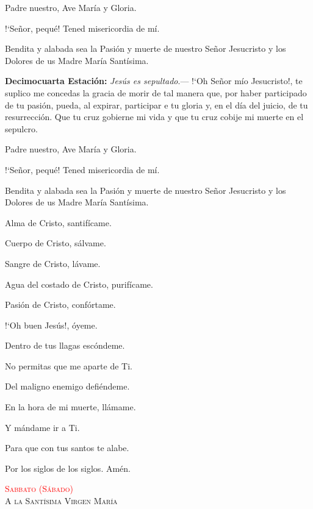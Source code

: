 \documentclass[10pt]{article}
\begin{document}
\begin{multicols}{2}
      \vspace{2mm}

      Padre nuestro, Ave María y Gloria.

      {!`}Señor, pequé! Tened misericordia de mí.

      Bendita y alabada sea la Pasión y muerte de nuestro Señor Jesucristo y los Dolores de us Madre María Santísima.

      \vspace{2mm}

      \textbf{Decimocuarta Estación:} \textit{Jesús es sepultado}.--- {!`}Oh Señor mío Jesucristo!, te suplico me concedas la gracia de morir de tal manera que, por haber participado de tu pasión,
      pueda, al expirar, participar e tu gloria y, en el día del juicio, de tu resurrección. Que tu cruz gobierne mi vida y que tu cruz cobije mi muerte en el sepulcro.

      \vspace{2mm}

      Padre nuestro, Ave María y Gloria.

      {!`}Señor, pequé! Tened misericordia de mí.

      Bendita y alabada sea la Pasión y muerte de nuestro Señor Jesucristo y los Dolores de us Madre María Santísima.

      \vspace{2mm}

      Alma de Cristo, santifícame.

      Cuerpo de Cristo, sálvame.

      Sangre de Cristo, lávame.

      Agua del costado de Cristo, purifícame.

      Pasión de Cristo, confórtame.

      {!`}Oh buen Jesús!, óyeme.

      Dentro de tus llagas escóndeme.
      
      No permitas que me aparte de Ti.

      Del maligno enemigo defiéndeme.

      En la hora de mi muerte, llámame.

      Y mándame ir a Ti.

      Para que con tus santos te alabe.

      Por los siglos de los siglos. Amén.


      \begin{center}
            \noindent\textsc{\textcolor{red}{Sabbato (Sábado)}\\ {\large A la Santísima Virgen María}}
      \end{center}


\end{multicols}
\end{document}
